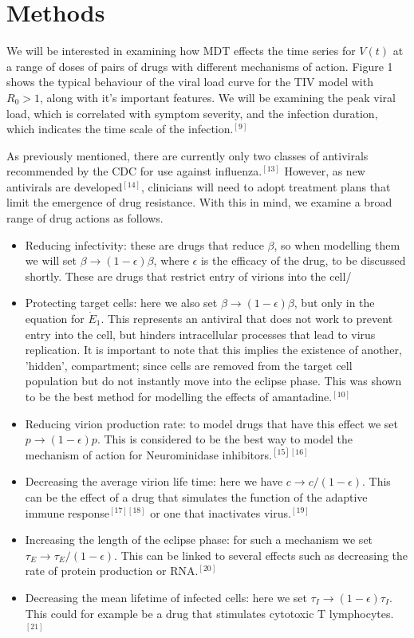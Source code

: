 \documentclass[a4paper,11pt]{article}
\begin{document}
\section*{Methods}
We will be interested in examining how MDT effects the time series for $V(t)$ at a range of doses of pairs of drugs with different mechanisms of action. Figure 1 shows the typical behaviour of the viral load curve for the TIV model with $R_0 > 1$, along with it's important features. We will be examining the peak viral load, which is correlated with symptom severity, and the infection duration, which indicates the time scale of the infection.$^{[9]}$ 

As previously mentioned, there are currently only two classes of antivirals recommended by the CDC for use against influenza.$^{[13]}$ However, as new antivirals are developed$^{[14]}$, clinicians will need to adopt treatment plans that limit the emergence of drug resistance. With this in mind, we examine a broad range of drug actions as follows. 

\begin{itemize}
    \item Reducing infectivity: these are drugs that reduce $\beta$, so when modelling them we will set $\beta \rightarrow (1-\epsilon)\beta$, where $\epsilon$ is the efficacy of the drug, to be discussed shortly. These are drugs that restrict entry of virions into the cell/
    \item Protecting target cells: here we also set $\beta \rightarrow (1-\epsilon)\beta$, but only in the equation for $\dot{E}_1$. This represents an antiviral that does not work to prevent entry into the cell, but hinders intracellular processes that lead to virus replication. It is important to note that this implies the existence of another, 'hidden', compartment; since cells are removed from the target cell population but do not instantly move into the eclipse phase. This was shown to be the best method for modelling the effects of amantadine.$^{[10]}$ 
    \item Reducing virion production rate: to model drugs that have this effect we set $p \rightarrow (1-\epsilon)p$. This is considered to be the best way to model the mechanism of action for Neurominidase inhibitors.$^{[15][16]}$
    \item Decreasing the average virion life time: here we have $c \rightarrow c/(1-\epsilon)$. This can be the effect of a drug that simulates the function of the adaptive immune response$^{[17][18]}$ or one that inactivates virus.$^{[19]}$
    \item Increasing the length of the eclipse phase: for such a mechanism we set $\tau_E \rightarrow \tau_E/(1-\epsilon)$. This can be linked to several effects such as decreasing the rate of protein production or RNA.$^{[20]}$
    \item Decreasing the mean lifetime of infected cells: here we set $\tau_I \rightarrow (1-\epsilon)\tau_I$. This could for example be a drug that stimulates cytotoxic T lymphocytes.$^{[21]}$
\end{itemize}
\end{document}
